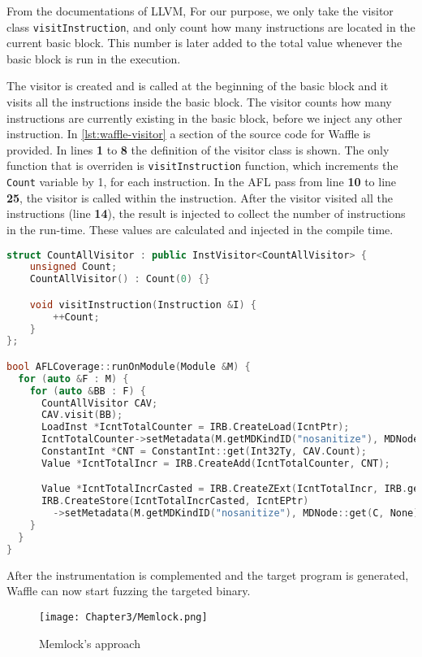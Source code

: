 From the documentations of LLVM,  For our purpose, we only take the visitor class \texttt{visitInstruction}, and only count how many instructions are located in the current basic block. This number is later added to the total value whenever the basic block is run in the execution.

The visitor is created and is called at the beginning of the basic block and it visits all the instructions inside the basic block. The visitor counts how many instructions are currently existing in the basic block, before we inject any other instruction. In \ref{lst:waffle-visitor} a section of the source code for Waffle is provided. In lines \textbf{1} to \textbf{8} the definition of the visitor class is shown. The only function that is overriden is \texttt{visitInstruction} function, which increments the \texttt{Count} variable by 1, for each instruction. In the AFL pass from line \textbf{10} to line \textbf{25}, the visitor is called within the instruction. After the visitor visited all the instructions (line \textbf{14}), the result is injected to collect the number of instructions in the run-time. These values are calculated and injected in the compile time.

\begin{lstlisting}[language=C++,style=CodeStyle,caption={Waffle's instruction counting},label={lst:waffle-visitor}]
struct CountAllVisitor : public InstVisitor<CountAllVisitor> {
    unsigned Count;
    CountAllVisitor() : Count(0) {}

    void visitInstruction(Instruction &I) {
        ++Count;
    }        
};

bool AFLCoverage::runOnModule(Module &M) {
  for (auto &F : M) {
    for (auto &BB : F) {
      CountAllVisitor CAV;
      CAV.visit(BB);
      LoadInst *IcntTotalCounter = IRB.CreateLoad(IcntPtr);
      IcntTotalCounter->setMetadata(M.getMDKindID("nosanitize"), MDNode::get(C, None));
      ConstantInt *CNT = ConstantInt::get(Int32Ty, CAV.Count);
      Value *IcntTotalIncr = IRB.CreateAdd(IcntTotalCounter, CNT);

      Value *IcntTotalIncrCasted = IRB.CreateZExt(IcntTotalIncr, IRB.getInt32Ty());
      IRB.CreateStore(IcntTotalIncrCasted, IcntEPtr)
        ->setMetadata(M.getMDKindID("nosanitize"), MDNode::get(C, None));
    }
  }
}
\end{lstlisting}

After the instrumentation is complemented and the target program is generated, Waffle can now start fuzzing the targeted binary.

\begin{figure}[!b]
    \texttt{[image: Chapter3/Memlock.png]}
    \centering
    \caption{Memlock's approach} 
    \label{fig:memlock}
\end{figure}

